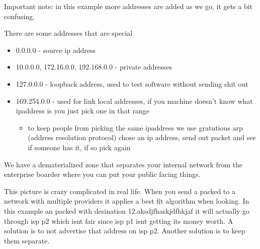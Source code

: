 \documentclass[12pt]{article}
\begin{document}
Important note: in this example more addresses are added as we go, it gets a bit confusing.


There are some addresses that are special

\begin{itemize}
  \item 0.0.0.0 - source ip address
  \item 10.0.0.0, 172.16.0.0, 192.168.0.0 - private addresses
  \item 127.0.0.0 - loopback address, used to test software without sending shit out
  \item 169.254.0.0 - used for link local addresses, if you machine doesn't know what ipaddress is you just pick one in that range
  \begin{itemize}
    \item to keep people from picking the same ipaddress we use gratutious arp (address resolution protocol) chose an ip address, send out packet and see if someone has it, if so pick again
  \end{itemize}
\end{itemize}




We have a dematerialized zone that separates your internal network from the enterprise boarder where you can put your public facing things. 


This picture is crazy complicated in real life. When you send a packed to a network with multiple providers it applies a best fit algorithm when looking. In this example an packed with desination 12.aksdjfhaskjdfhkjaf it will actually go through isp p2 which isnt fair since isp p1 isnt getting its money worth. A solution is to not advertise that address on isp p2. Another solution is to keep them separate.
\end{document}

